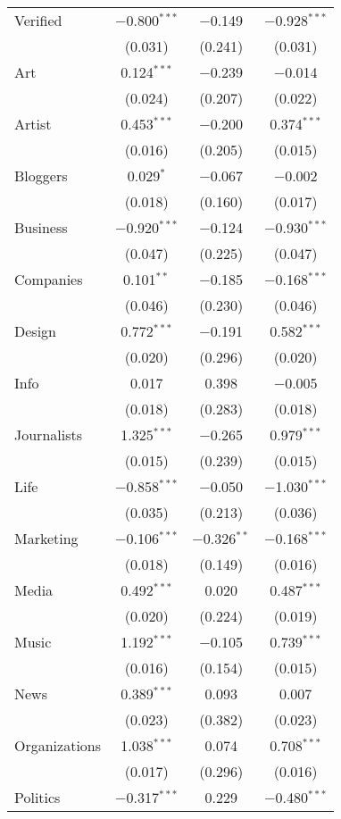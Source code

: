 \begin{table}[!htbp]
\begin{tabular}{@{\extracolsep{5pt}}lccc}
  Verified & $-$0.800$^{***}$ & $-$0.149 & $-$0.928$^{***}$ \\ 
  & (0.031) & (0.241) & (0.031) \\ 
  Art & 0.124$^{***}$ & $-$0.239 & $-$0.014 \\ 
  & (0.024) & (0.207) & (0.022) \\ 
  Artist & 0.453$^{***}$ & $-$0.200 & 0.374$^{***}$ \\ 
  & (0.016) & (0.205) & (0.015) \\ 
  Bloggers & 0.029$^{*}$ & $-$0.067 & $-$0.002 \\ 
  & (0.018) & (0.160) & (0.017) \\ 
  Business & $-$0.920$^{***}$ & $-$0.124 & $-$0.930$^{***}$ \\ 
  & (0.047) & (0.225) & (0.047) \\ 
  Companies & 0.101$^{**}$ & $-$0.185 & $-$0.168$^{***}$ \\ 
  & (0.046) & (0.230) & (0.046) \\ 
  Design & 0.772$^{***}$ & $-$0.191 & 0.582$^{***}$ \\ 
  & (0.020) & (0.296) & (0.020) \\ 
  Info & 0.017 & 0.398 & $-$0.005 \\ 
  & (0.018) & (0.283) & (0.018) \\ 
  Journalists & 1.325$^{***}$ & $-$0.265 & 0.979$^{***}$ \\ 
  & (0.015) & (0.239) & (0.015) \\ 
  Life & $-$0.858$^{***}$ & $-$0.050 & $-$1.030$^{***}$ \\ 
  & (0.035) & (0.213) & (0.036) \\ 
  Marketing & $-$0.106$^{***}$ & $-$0.326$^{**}$ & $-$0.168$^{***}$ \\ 
  & (0.018) & (0.149) & (0.016) \\ 
  Media & 0.492$^{***}$ & 0.020 & 0.487$^{***}$ \\ 
  & (0.020) & (0.224) & (0.019) \\ 
  Music & 1.192$^{***}$ & $-$0.105 & 0.739$^{***}$ \\ 
  & (0.016) & (0.154) & (0.015) \\ 
  News & 0.389$^{***}$ & 0.093 & 0.007 \\ 
  & (0.023) & (0.382) & (0.023) \\ 
  Organizations & 1.038$^{***}$ & 0.074 & 0.708$^{***}$ \\ 
  & (0.017) & (0.296) & (0.016) \\ 
  Politics & $-$0.317$^{***}$ & 0.229 & $-$0.480$^{***}$ \\ 

\end{tabular}
\end{table}
